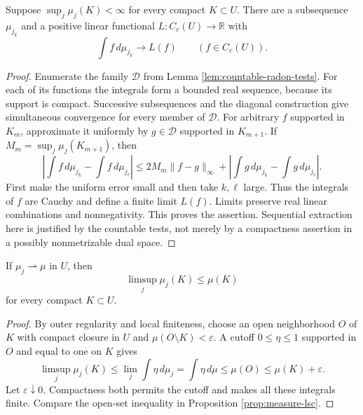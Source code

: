 \begin{lemma}\label{lem:measure-diagonal-functional}
Suppose $\sup_j\mu_j(K)<\infty$ for every compact $K\subset U$. There are a subsequence $\mu_{j_k}$ and a positive linear functional $L:C_c(U)\to\mathbb R$ with
\[
 \int f\,d\mu_{j_k}\longrightarrow L(f)\qquad(f\in C_c(U)).
\]
\end{lemma}
\begin{proof}
Enumerate the family $\mathcal D$ from Lemma \ref{lem:countable-radon-tests}. For each of its functions the integrals form a bounded real sequence, because its support is compact. Successive subsequences and the diagonal construction give simultaneous convergence for every member of $\mathcal D$. For arbitrary $f$ supported in $K_m$, approximate it uniformly by $g\in\mathcal D$ supported in $K_{m+1}$. If $M_m=\sup_j\mu_j(K_{m+1})$, then
\[
 \left|\int f\,d\mu_{j_k}-\int f\,d\mu_{j_\ell}\right|
 \leq2M_m\|f-g\|_\infty+
 \left|\int g\,d\mu_{j_k}-\int g\,d\mu_{j_\ell}\right|.
\]
First make the uniform error small and then take $k,\ell$ large. Thus the integrals of $f$ are Cauchy and define a finite limit $L(f)$. Limits preserve real linear combinations and nonnegativity. This proves the assertion. Sequential extraction here is justified by the countable tests, not merely by a compactness assertion in a possibly nonmetrizable dual space.
\end{proof}

\begin{proposition}\label{prop:measure-compact-usc}
If $\mu_j\rightharpoonup\mu$ in $U$, then
\[
 \limsup_j\mu_j(K)\leq\mu(K)
\]
for every compact $K\subset U$.
\end{proposition}
\begin{proof}
By outer regularity and local finiteness, choose an open neighborhood $O$ of $K$ with compact closure in $U$ and $\mu(O\setminus K)<\varepsilon$. A cutoff $0\leq\eta\leq1$ supported in $O$ and equal to one on $K$ gives
\[
 \limsup_j\mu_j(K)\leq\lim_j\int\eta\,d\mu_j
 =\int\eta\,d\mu\leq\mu(O)\leq\mu(K)+\varepsilon.
\]
Let $\varepsilon\downarrow0$. Compactness both permits the cutoff and makes all these integrals finite. Compare the open-set inequality in Proposition \ref{prop:measure-lsc}.
\end{proof}

